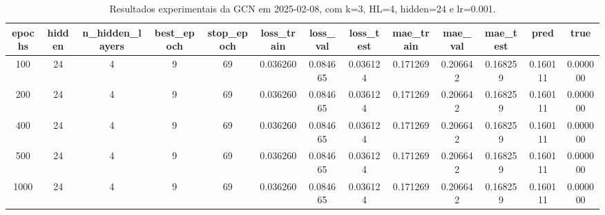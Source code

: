 \begin{table}[h]
\centering
\caption{Resultados experimentais da GCN em 2025-02-08, com k=3, HL=4, hidden=24 e lr=0.001.}
\label{tab:gcn_results_k3_hl4_h24_d20250208}
\begin{tabular}{ccccccccccccc}
\toprule
epochs & hidden & n\_hidden\_layers & best\_epoch & stop\_epoch & loss\_train & loss\_val & loss\_test & mae\_train & mae\_val & mae\_test & pred & true \\
\midrule
100 & 24 & 4 & 9 & 69 & 0.036260 & 0.084665 & 0.036124 & 0.171269 & 0.206642 & 0.168259 & 0.160111 & 0.000000 \\
200 & 24 & 4 & 9 & 69 & 0.036260 & 0.084665 & 0.036124 & 0.171269 & 0.206642 & 0.168259 & 0.160111 & 0.000000 \\
400 & 24 & 4 & 9 & 69 & 0.036260 & 0.084665 & 0.036124 & 0.171269 & 0.206642 & 0.168259 & 0.160111 & 0.000000 \\
500 & 24 & 4 & 9 & 69 & 0.036260 & 0.084665 & 0.036124 & 0.171269 & 0.206642 & 0.168259 & 0.160111 & 0.000000 \\
1000 & 24 & 4 & 9 & 69 & 0.036260 & 0.084665 & 0.036124 & 0.171269 & 0.206642 & 0.168259 & 0.160111 & 0.000000 \\
\bottomrule
\end{tabular}
\end{table}

